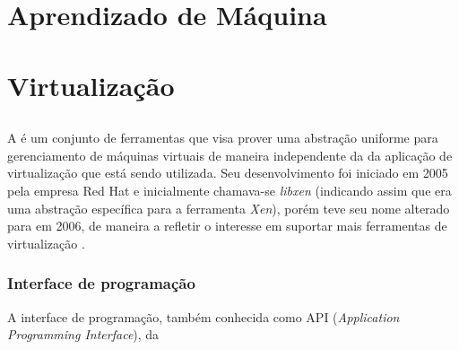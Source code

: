 %
%

\chapter{Aprendizado de Máquina}\label{sec:aprendizado}



\chapter{Virtualização}


\section{\libvirt}\label{sec:libvirt}


A \libvirt é um conjunto de ferramentas que visa prover uma abstração
uniforme para gerenciamento de máquinas virtuais de maneira independente da
da aplicação de virtualização que está sendo utilizada. Seu desenvolvimento
foi iniciado em 2005 pela empresa Red Hat e inicialmente chamava-se
\emph{libxen} (indicando assim que era uma abstração específica para a
ferramenta \emph{Xen}), porém teve seu nome alterado para \libvirt em
2006, de maneira a refletir o interesse em suportar mais ferramentas de
virtualização .

\subsection{Interface de programação}\label{sec:libvirtapi}

A interface de programação, também conhecida como API (\emph{Application
Programming Interface}), da \libvirt

